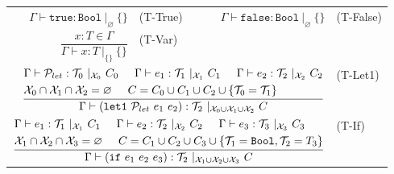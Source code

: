 \documentclass{article}
\begin{document}
\begin{figure}
    \centering
    \begin{tabular}{rlrl}
        $\Gamma \vdash \mathtt{true} : \mathtt{Bool}\ |_\varnothing\ \{\}$ & (T-True) &
        $\Gamma \vdash \mathtt{false} : \mathtt{Bool}\ |_\varnothing\ \{\}$ & (T-False) \vspace{5mm} \\

        $\dfrac{x : T \in \Gamma}{\Gamma \vdash x : T\ |_{\{\}}\ \{\}}$ & (T-Var) \vspace{5mm} \\

        \multicolumn{3}{r}{
        $\dfrac{\begin{aligned}
        &\Gamma \vdash \mathcal{P}_{let} : \mathcal{T}_0\ |_{\mathcal{X}_0}\ C_0 \hspace{5mm}
        \Gamma \vdash e_1 : \mathcal{T}_1\ |_{\mathcal{X}_1}\ C_1 \hspace{5mm}
        \Gamma \vdash e_2 : \mathcal{T}_2\ |_{\mathcal{X}_2}\ C_2\\
        &\mathcal{X}_0 \cap \mathcal{X}_1 \cap \mathcal{X}_2 = \varnothing \hspace{5mm}
        C = C_0 \cup C_1 \cup C_2 \cup \{ \mathcal{T}_0 = \mathcal{T}_1 \}
        \end{aligned}}{\Gamma \vdash (\mathtt{let1}\ \mathcal{P}_{let}\ e_1\ e_2) : \mathcal{T}_2\ |_{\mathcal{X}_0 \cup \mathcal{X}_1 \cup \mathcal{X}_2}\ C}$} & (T-Let1) \vspace{5mm} \\

        \multicolumn{3}{r}{
        $\dfrac{\begin{aligned}
        &\Gamma \vdash e_1 : \mathcal{T}_1\ |_{\mathcal{X}_1}\ C_1 \hspace{5mm} \Gamma \vdash e_2 : \mathcal{T}_2\ |_{\mathcal{X}_2}\ C_2 \hspace{5mm} \Gamma \vdash e_3 : \mathcal{T}_3\ |_{\mathcal{X}_3}\ C_3 \\
        &\mathcal{X}_1 \cap \mathcal{X}_2 \cap \mathcal{X}_3 = \varnothing \hspace{5mm} C = C_1 \cup C_2 \cup C_3 \cup \{ \mathcal{T}_1 = \mathtt{Bool}, \mathcal{T}_2 = T_3 \}
        \end{aligned}}{\Gamma \vdash (\mathtt{if}\ e_1\ e_2\ e_3) : \mathcal{T}_2\ |_{\mathcal{X}_1 \cup \mathcal{X}_2 \cup \mathcal{X}_3}\ C}$} & (T-If) \vspace{5mm} \\


\end{tabular}
\end{figure}
\end{document}
